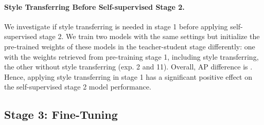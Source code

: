 \documentclass{article}
\begin{document}
\paragraph{Style Transferring Before Self-supervised Stage 2.}{We investigate if style transferring is needed in stage 1 before applying self-supervised stage 2. We train two models with the same settings but initialize the pre-trained weights of these models in the teacher-student stage differently: one with the weights retrieved from pre-training stage 1, including style transferring, the other without style transferring (exp. 2 and 11). Overall, AP difference is . Hence, applying style transferring in stage 1 has a significant positive effect on the self-supervised stage 2 model performance.}

\subsection{Stage 3: Fine-Tuning}
\label{res:sup_train}
\end{document}
